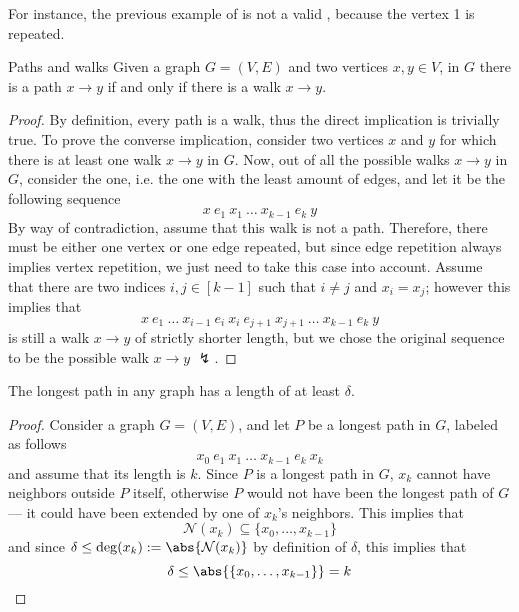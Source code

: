 \documentclass[a4paper, 12pt]{report}
\begin{document}
    For instance, the previous example of  is not a valid , because the vertex 1 is repeated.

    \begin{framedthm}[label={paths and walks}]{Paths and walks}
        Given a graph $G = (V, E)$ and two vertices $x, y \in V$, in $G$ there is a path $x \to y$ if and only if there is a walk $x \to y$.
    \end{framedthm}

    \begin{proof}
        By definition, every path is a walk, thus the direct implication is trivially true. To prove the converse implication, consider two vertices $x$ and $y$ for which there is at least one walk $x \to y$ in $G$. Now, out of all the possible walks $x \to y$ in $G$, consider the  one, i.e. the one with the least amount of edges, and let it be the following sequence $$x \ e_1 \ x_1 \ \ldots \ x_{k - 1} \ e_k \ y $$ By way of contradiction, assume that this walk is not a path. Therefore, there must be either one vertex or one edge repeated, but since edge repetition always implies vertex repetition, we just need to take this case into account. Assume that there are two indices $i, j \in [k - 1]$ such that $i \neq j$ and $x_i = x_j$; however this implies that $$x \ e_1 \ \ldots \ x_{i - 1} \ e_i \ x_i \ e_{j + 1} \ x_{j + 1} \ \ldots \ x_{k - 1} \ e_k \ y$$ is still a walk $x \to y$ of strictly shorter length, but we chose the original sequence to be the  possible walk $x \to y$ $\lightning$.
    \end{proof}

    \begin{framedprop}[label={longest path len}]{}
        The longest path in any graph has a length of at least $\delta$.
    \end{framedprop}
    
    \begin{proof}
        Consider a graph $G = (V, E)$, and let $P$ be a longest path in $G$, labeled as follows $$x_0 \ e_1 \ x_1 \ \ldots \ x_{k - 1} \ e_k \ x_k$$ and assume that its length is $k$. Since $P$ is a longest path in $G$, $x_k$ cannot have neighbors outside $P$ itself, otherwise $P$ would not have been the longest path of $G$ --- it could have been extended by one of $x_k$'s neighbors. This implies that $$\mathcal N(x_k) \subseteq \{x_0, \ldots, x_{k - 1}\}$$ and since $\delta \le \deg(x_k) := \abs{\mathcal N(x_k)}$ by definition of $\delta$, this implies that $$\delta \le \abs{\{x_0, \ldots, x_{k - 1}\}} = k$$
    \end{proof}
\end{document}
